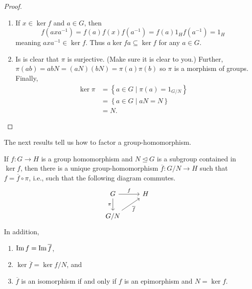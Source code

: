 \documentclass[11pt,a4paper]{article}
\begin{document}
\begin{proof}
\begin{enumerate}[label=(\roman*)]
    \item If \(x\in \ker f\) and \(a\in G\), then 
    \[f(axa^{-1}) = f(a)f(x)f(a^{-1}) = f(a)1_H f(a^{-1}) = 1_H\]
    meaning \(axa^{-1} \in \ker f\).
    Thus \(a \ker f a \subseteq \ker f\) for any \(a\in G\).

    \item Is is clear that \(\pi\) is surjective. (Make sure it is clear to you.) Further, \(\pi (ab) = ab N = (aN)(bN) = \pi (a) \pi (b)\) so \(\pi\) is a morphism of groups.
    Finally, 
    \begin{align*}
        \ker \pi &= \left\{ a\in G \mid \pi (a) = 1_{G/N} \right\}\\
        &= \left\{ a\in G \mid aN  = N \right\}\\
        &= N.
    \end{align*}
\end{enumerate}
\end{proof}

 The next results tell us how to factor a group-homomorphism.

\begin{teo}\label{thm:dad.of.isomorphism.thms}
    If \( f: G \to H \) is a group homomorphism and \( N \trianglelefteq G \) is a subgroup contained in \( \ker f \), then there is a unique group-homomorphism \(\overline{f}\colon G/N \to H\) such that \(f = \overline{f}\circ \pi\), i.e., such that   the following diagram commutes.
    \[\begin{tikzcd}
        G \arrow[r, "f"] \arrow[d, "\pi"'] & H \\
        G/N \arrow[ru, "\overline{f}"']    &  
        \end{tikzcd}\]
    In addition, 
    \begin{enumerate}[label=(\roman*)]
        \item \(\operatorname{Im} f = \operatorname{Im} \overline{f}\),
        \item \(\ker \overline{f} = \ker f / N\), and 
        \item \(\overline{f} \) is an isomorphism if and only if \(f\) is an epimorphism and \(N = \ker f\).
    \end{enumerate}
\end{teo}
\end{document}
